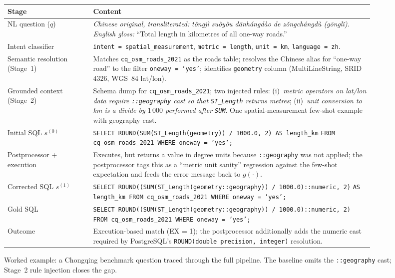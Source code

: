 \documentclass[11pt]{article}
\begin{document}
\begin{figure}[t]
\centering
\footnotesize
\begin{tabular}{@{}p{0.22\linewidth}p{0.72\linewidth}@{}}
\toprule
Stage & Content \\
\midrule
NL question ($q$) & \emph{Chinese original, transliterated:} \textit{t\v{o}ngj\`{i} su\v{o}y\v{o}u d\={a}nh\'{a}ngd\`{a}o de z\v{o}ngch\'{a}ngd\`{u} (g\={o}ngl\v{i})}. \emph{English gloss:} ``Total length in kilometres of all one-way roads.'' \\
\midrule
Intent classifier & \texttt{intent = spatial\_measurement}, \texttt{metric = length}, \texttt{unit = km}, \texttt{language = zh}. \\
\midrule
Semantic resolution (Stage~1) &
Matches \texttt{cq\_osm\_roads\_2021} as the roads table; resolves the Chinese alias for ``one-way road'' to the filter \texttt{oneway = `yes'}; identifies \texttt{geometry} column (MultiLineString, SRID $4326$, WGS~84 lat/lon). \\
\midrule
Grounded context (Stage~2) &
Schema dump for \texttt{cq\_osm\_roads\_2021}; two injected rules: (i)~\emph{metric operators on lat/lon data require \texttt{::geography} cast so that \texttt{ST\_Length} returns metres}; (ii)~\emph{unit conversion to km is a divide by $1\,000$ performed after \texttt{SUM}}. One spatial-measurement few-shot example with geography cast. \\
\midrule
Initial SQL $s^{(0)}$ &
\texttt{SELECT ROUND(SUM(ST\_Length(geometry)) / 1000.0, 2) AS length\_km}\newline
\texttt{FROM cq\_osm\_roads\_2021 WHERE oneway = 'yes';} \\
\midrule
Postprocessor + execution &
Executes, but returns a value in degree units because \texttt{::geography} was not applied; the postprocessor tags this as a ``metric unit sanity'' regression against the few-shot expectation and feeds the error message back to $g(\cdot)$. \\
\midrule
Corrected SQL $s^{(1)}$ &
\texttt{SELECT ROUND((SUM(ST\_Length(geometry::geography)) / 1000.0)::numeric, 2)}\newline
\texttt{AS length\_km FROM cq\_osm\_roads\_2021 WHERE oneway = 'yes';} \\
\midrule
Gold SQL &
\texttt{SELECT ROUND((SUM(ST\_Length(geometry::geography)) / 1000.0)::numeric, 2)}\newline
\texttt{FROM cq\_osm\_roads\_2021 WHERE oneway = 'yes';} \\
\midrule
Outcome & Execution-based match (EX = 1); the postprocessor additionally adds the numeric cast required by PostgreSQL's \texttt{ROUND(double precision, integer)} resolution. \\
\bottomrule
\end{tabular}
\caption{Worked example: a Chongqing benchmark question traced through the full pipeline. The baseline omits the \texttt{::geography} cast; Stage~2 rule injection closes the gap.}
\label{fig:worked-example}
\end{figure}
\end{document}
